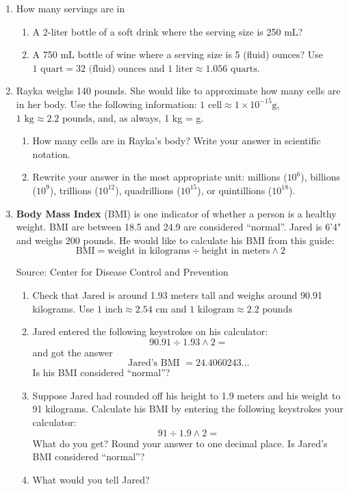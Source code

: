 \begin{enumerate}
\item How many servings are in 
\begin{enumerate}
\item A 2-liter bottle of a soft drink where the serving size is 250 mL?
\item A 750 mL bottle of wine where a serving size is 5 (fluid) ounces?  Use $1 \text{ quart} = 32 \text{ (fluid) ounces}$ and $1 \text{ liter} \approx 1.056 \text{ quarts}$.
\end{enumerate}

\item  Rayka weighs 140 pounds. She would like to approximate how many cells are in her body.  Use the following information: $1 \text{ cell} \approx 1 \times 10^{-15} \text{g}$, $1 \text{ kg} \approx \text{2.2 pounds} $, and, as always, 1 kg =  g.
\begin{enumerate}
\item How many cells are in Rayka's body?  Write your answer in scientific notation.
\item Rewrite your answer in the most appropriate unit:  millions ($10^6$), billions ($10^9$), trillions ($10^{12}$), quadrillions ($10^{15}$), or quintillions ($10^{18}$).
\end{enumerate}

\item  \textbf{Body Mass Index} (BMI) is one indicator of whether a person is a healthy weight.  BMI are between 18.5 and 24.9 are considered ``normal''.  Jared is 6'4" and weighs 200 pounds.  He would like to calculate his BMI from this guide:
$$\text{BMI} = \text{weight in kilograms} \div \text{height in meters} \wedge 2$$
\hfill \begin{footnotesize} Source:  Center for Disease Control and Prevention  \end{footnotesize}
\begin{enumerate}
\item Check that Jared is around 1.93 meters tall and weighs around 90.91 kilograms.  Use $1 \text{ inch} \approx 2.54 \text{ cm}$ and $1 \text{ kilogram} \approx 2.2 \text{ pounds}$
\item Jared entered the following keystrokes on his calculator: $$90.91 \div 1.93 \wedge 2=$$
and got the answer $$\text{Jared's BMI } = 24.4060243\ldots$$ Is his BMI considered ``normal''?
\item Suppose Jared had rounded off his height to 1.9 meters and his weight to 91 kilograms.  Calculate his BMI by entering the following keystrokes your calculator:  $$91 \div 1.9 \wedge 2=$$
What do you get?  Round your answer to one decimal place.  Is Jared's BMI considered ``normal''?
\item What would you tell Jared?
\end{enumerate}






\end{enumerate}




